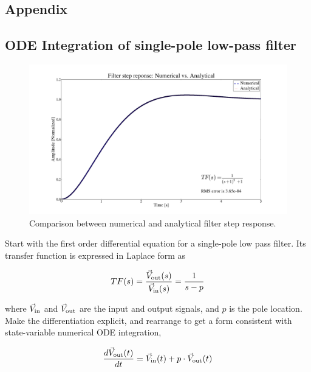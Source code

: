 \documentclass[a4paper,12pt]{article}
\begin{document}
\newpage

\begin{appendix}

\section{Appendix}

\subsection{ODE Integration of single-pole low-pass filter}
\label{App:ODE_integration}

\begin{figure}
\centering
\includegraphics[scale=0.265]{../figures/filter_step_response.png}
\caption{Comparison between numerical and analytical filter step response.}
\label{fig:filter_step_response}
\end{figure}

Start with the first order differential equation for a single-pole low pass filter. Its transfer function is expressed in Laplace form as

\begin{equation}
 TF(s)=\frac{\vec V_{\rm out}(s)}{\vec V_{\rm in}(s)} = \frac{1}{s-p}
\end{equation}

\noindent where $\vec V_{\rm in}$ and $\vec V_{\rm out}$ are the input and output signals, and $p$ is the pole location. Make the differentiation explicit, and rearrange to get a form consistent with state-variable numerical ODE integration,

\begin{equation}
 \frac{d\vec V_{\rm out}(t)}{dt} = \vec V_{\rm in}(t) + p\cdot \vec V_{\rm out}(t)
\label{eq:exp_diff}
\end{equation}


\end{appendix}
\end{document}
